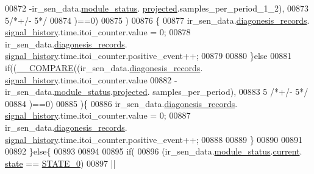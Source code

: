 \begin{DoxyCode}
00872                                   -ir\_sen\_data.\hyperlink{a00023_a5a53c391562b059eb744ac679f3765ca}{module\_status}.
      \hyperlink{a00017_a6b2516d74583418cec324c50041421c9}{projected}.samples\_per\_period\_1\_2),
00873                                5\textcolor{comment}{/*+/- 5*/}
00874                           )==0)
00875                          )
00876                        \{
00877                            ir\_sen\_data.\hyperlink{a00023_a7ae905b560513ad201e58c2f63375030}{diagonesis\_records}.
      \hyperlink{a00017_affb63906d23cb1cb7787d61eaaedfb60}{signal\_history}.time.itoi\_counter.value = 0;
00878                            ir\_sen\_data.\hyperlink{a00023_a7ae905b560513ad201e58c2f63375030}{diagonesis\_records}.
      \hyperlink{a00017_affb63906d23cb1cb7787d61eaaedfb60}{signal\_history}.time.itoi\_counter.positive\_event++;
00879 
00880                        \}\textcolor{keywordflow}{else}
00881                           \textcolor{keywordflow}{if}((\hyperlink{a00021_a1aaf79017d1250538fff385827b7401e}{\_\_COMPARE}((ir\_sen\_data.\hyperlink{a00023_a7ae905b560513ad201e58c2f63375030}{diagonesis\_records}.
      \hyperlink{a00017_affb63906d23cb1cb7787d61eaaedfb60}{signal\_history}.time.itoi\_counter.value
00882                                -ir\_sen\_data.\hyperlink{a00023_a5a53c391562b059eb744ac679f3765ca}{module\_status}.\hyperlink{a00017_a6b2516d74583418cec324c50041421c9}{projected}.
      samples\_per\_period),
00883                                5 \textcolor{comment}{/*+/- 5*/}
00884                               )==0)
00885                             )\{
00886                               ir\_sen\_data.\hyperlink{a00023_a7ae905b560513ad201e58c2f63375030}{diagonesis\_records}.
      \hyperlink{a00017_affb63906d23cb1cb7787d61eaaedfb60}{signal\_history}.time.itoi\_counter.value = 0;
00887                               ir\_sen\_data.\hyperlink{a00023_a7ae905b560513ad201e58c2f63375030}{diagonesis\_records}.
      \hyperlink{a00017_affb63906d23cb1cb7787d61eaaedfb60}{signal\_history}.time.itoi\_counter.positive\_event++;
00888 
00889                              \}
00890 
00891 
00892                  \}\textcolor{keywordflow}{else}\{
00893 
00894 
00895                      \textcolor{keywordflow}{if}(
00896                        (ir\_sen\_data.\hyperlink{a00023_a5a53c391562b059eb744ac679f3765ca}{module\_status}.\hyperlink{a00017_ab8af48cdbba92b3ae39c4470e53af944}{current}.
      \hyperlink{a00017_a6b8d8e916bc56265a3fd279bd26b6d1b}{state} == \hyperlink{a00021_ad6739dbbe5581cac99b7dc8a5e09949c}{STATE\_0})
00897                        ||

\end{DoxyCode}
